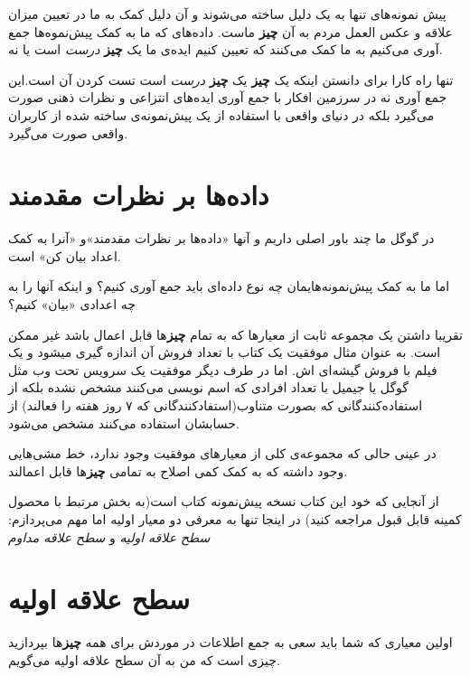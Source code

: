 پیش نمونه‌های تنها به یک دلیل ساخته می‌شوند و آن دلیل کمک به ما در تعیین
میزان علاقه و عکس العمل مردم به آن \textbf{چیز} ماست. داده‌های که ما به
کمک پیش‌نموه‌ها جمع آوری می‌کنیم به ما کمک می‌کنند که تعیین کنیم ایده‌ی
ما یک \textbf{چیز} \emph{درست} است یا نه.

تنها راه کارا برای دانستن اینکه یک \textbf{چیز} یک \textbf{چیز}
\emph{درست} است تست کردن آن است.این جمع آوری نه در سرزمین افکار با جمع
آوری ایده‌های انتزاعی و نظرات ذهنی صورت می‌گیرد بلکه در دنیای واقعی با
استفاده از یک پیش‌نمونه‌ی ساخته شده از کاربران واقعی صورت می‌گیرد.

\section{داده‌ها بر نظرات
مقدمند}\label{ux62fux627ux62fux647ux647ux627-ux628ux631-ux646ux638ux631ux627ux62a-ux645ux642ux62fux645ux646ux62f}

در گوگل ما چند باور اصلی داریم و آنها «داده‌ها بر نظرات مقدمند»و «آنرا
به کمک اعداد بیان کن» است.

اما ما به کمک پیش‌نمونه‌هایمان چه نوع داده‌ای باید جمع آوری کنیم؟ و
اینکه آنها را به چه اعدادی «بیان» کنیم؟

تقریبا داشتن یک مجموعه ثابت از معیارها که به تمام \textbf{چیز}ها قابل
اعمال باشد غیر ممکن است. به عنوان مثال موفقیت یک کتاب با تعداد فروش آن
اندازه گیری میشود و یک فیلم با فروش گیشه‌ای اش. اما در طرف دیگر موفقیت
یک سرویس تحت وب مثل گوگل یا جیمیل با تعداد افرادی که اسم نویسی می‌کنند
مشخص نشده بلکه از استفاده‌کنندگانی که بصورت متناوب(استفادکنندگانی که ۷
روز هفته را فعالند) از حسابشان استفاده می‌کنند مشخص می‌شود.

در عینی حالی که مجموعه‌ی کلی از معیارهای موفقیت وجود ندارد، خط مشی‌هایی
وجود داشته که به کمک کمی اصلاح به تمامی \textbf{چیز}ها قابل اعمالند.

از آنجایی که خود این کتاب نسخه پیش‌نمونه کتاب است(به بخش مرتبط با محصول
کمینه قابل قبول مراجعه کنید) در اینجا تنها به معرفی دو معیار اولیه اما
مهم می‌پردازم: \emph{سطح علاقه اولیه} و \emph{سطح علاقه مداوم}

\section{سطح علاقه
اولیه}\label{ux633ux637ux62d-ux639ux644ux627ux642ux647-ux627ux648ux644ux6ccux647}

اولین معیاری که شما باید سعی به جمع اطلاعات در موردش برای همه
\textbf{چیز}ها بپردازید چیزی است که من به آن سطح علاقه اولیه می‌گویم.

